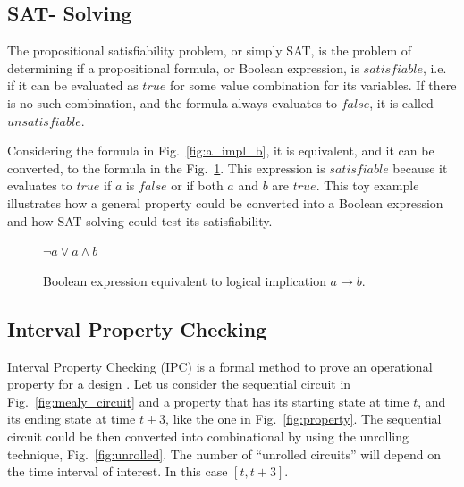 \subsection*{SAT- Solving}

The propositional satisfiability problem, or simply SAT, is the problem of determining if a propositional formula, or Boolean expression, is $satisfiable$, i.e. if it can be evaluated as $true$ for some value combination for its variables. If there is no such combination, and the formula always evaluates to $false$, it is called $unsatisfiable$. 

Considering the formula in Fig.~\ref{fig:a_impl_b}, it is equivalent, and it can be converted, to the formula in the Fig.~\ref{fig:not_a_or_a_and_b}. This expression is $satisfiable$ because it evaluates to $true$ if $a$ is $false$ or if both $a$ and $b$ are $true$. This toy example illustrates how a general property could be converted into a Boolean expression and how SAT-solving could test its satisfiability.

\begin{figure}[htb!]
    \begin{center}
        $\neg a \lor a \land b$
    \end{center}
    \caption{Boolean expression equivalent to logical implication $a \longrightarrow b$.}  
    \label{fig:not_a_or_a_and_b}
\end{figure}

\subsection{Interval Property Checking}
\label{subsection:ipc}

Interval Property Checking (IPC) is a formal method to prove an operational property for a design . Let us consider the sequential circuit in Fig.~\ref{fig:mealy_circuit} and a property that has its starting state at time $t$, and its ending state at time $t+3$, like the one in Fig.~\ref{fig:property}. The sequential circuit could be then converted into combinational by using the unrolling technique, Fig.~\ref{fig:unrolled}. The number of “unrolled circuits” will depend on the time interval of interest. In this case $[t, t+3]$.

